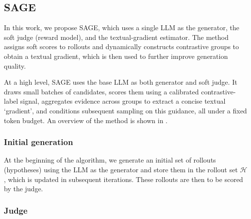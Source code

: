 \documentclass[11pt]{article}
\theoremstyle{plain}
\theoremstyle{definition}
\theoremstyle{remark}
\newcommand{\method}{SAGE}
\begin{document}
\subsection{SAGE}\label{method}
In this work, we propose \method{}, which uses a single LLM as the generator, the soft judge (reward model), and the textual-gradient estimator. The method assigns soft scores to rollouts and dynamically constructs contrastive groups to obtain a textual gradient, which is then used to further improve generation quality.

At a high level, \method{} uses the base LLM as both generator and soft judge. It draws small batches of candidates, scores them using a calibrated contrastive-label signal, aggregates evidence across groups to extract a concise textual `gradient', and conditions subsequent sampling on this guidance, all under a fixed token budget. An overview of the method is shown in .

\subsubsection{Initial generation}
At the beginning of the algorithm, we generate an initial set of rollouts (hypotheses) using the LLM as the generator and store them in the rollout set $\mathcal{H}$, which is updated in subsequent iterations. These rollouts are then to be scored by the judge.


\subsubsection{Judge}
\end{document}
